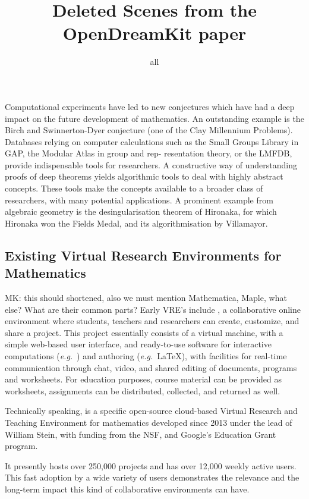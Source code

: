 \documentclass{article}
\title{Deleted Scenes from the OpenDreamKit paper}
\author{all}
\begin{document}
\maketitle

Computational experiments have led to new conjectures which have had a deep impact on the
future development of mathematics. An outstanding example is the Birch and Swinnerton-Dyer
conjecture (one of the Clay Millennium Problems).  Databases relying on computer
calculations such as the Small Groups Library in GAP, the Modular Atlas in group and rep-
resentation theory, or the LMFDB, provide indispensable tools for researchers. A
constructive way of understanding proofs of deep theorems yields algorithmic tools to deal
with highly abstract concepts. These tools make the concepts available to a broader class
of researchers, with many potential applications. A prominent example from algebraic
geometry is the desingularisation theorem of Hironaka, for which Hironaka won the Fields
Medal, and its algorithmisation by Villamayor.

\subsection{Existing Virtual Research Environments for Mathematics}

\begin{oldpart}{MK: this should shortened, also we must mention Mathematica, Maple, what
    else? What are their common parts?}
  Early VRE's include \SMC, a collaborative online environment where students, teachers
  and researchers can create, customize, and share a project. This project essentially
  consists of a virtual machine, with a simple web-based user interface, and ready-to-use
  software for interactive computations (\emph{e.g.}\ \Sage) and authoring (\emph{e.g.}\ \LaTeX), with
  facilities for real-time communication through chat, video, and shared editing of
  documents, programs and worksheets.  For education purposes, course material can be
  provided as worksheets, assignments can be distributed, collected, and returned as well.

  Technically speaking, \SMC is a specific open-source cloud-based Virtual Research and
  Teaching Environment for mathematics developed since 2013 under the lead of William
  Stein, with funding from the NSF, and Google's Education Grant program.    

  It presently hosts over 250,000 projects and has over 12,000 weekly active users. This
  fast adoption by a wide variety of users demonstrates the relevance and the long-term
  impact this kind of collaborative environments can have.
\end{oldpart}
\end{document}
